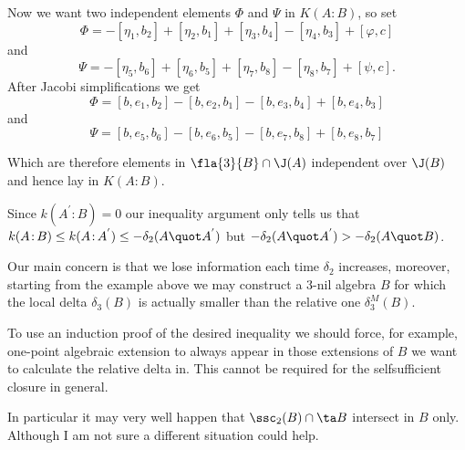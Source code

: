 \documentclass[a4paper,11pt,german,english]{article}
\begin{document}
\medskip
Now we want two independent elements $\Phi$ and $\Psi$ in $K(A\colon\!B)$, so set
$$\Phi=-[\eta_{1},b_{2}]+[\eta_{2},b_{1}]+[\eta_{3},b_{4}]-[\eta_{4},b_{3}]+[\varphi,c]$$
and
$$\Psi=-[\eta_{5},b_{6}]+[\eta_{6},b_{5}]+[\eta_{7},b_{8}]-[\eta_{8},b_{7}]+[\psi,c].$$
After Jacobi simplifications we get
$$\Phi=[b,e_{1},b_{2}]-[b,e_{2},b_{1}]-[b,e_{3},b_{4}]+[b,e_{4},b_{3}]$$
and
$$\Psi=[b,e_{5},b_{6}]-[b,e_{6},b_{5}]-[b,e_{7},b_{8}]+[b,e_{8},b_{7}]$$

Which are therefore elements in $\fla{3}{B}\cap\J(A)$ independent over $\J(B)$ and
hence lay in $K(A\colon\!B)$.

\medskip
Since $k(A^{'}\colon\!B)=0$ our inequality argument only tells us that 
$k(A\colon\!B)\leq k(A\colon\!A^{'})\leq -\delta_{2}(A\quot A^{'})$ but 
$-\delta_{2}(A\quot A^{'})>-\delta_{2}(A\quot B)$.

\medskip
Our main concern is that we lose information each time $\delta_{2}$ increases, moreover,
starting from the example above we may construct a $3$-nil algebra $B$ for which
the local delta $\delta_{3}(B)$ is actually smaller than the relative one $\delta_{3}^{M}(B)$.

\medskip
To use an induction proof of the desired inequality we should force, for example,
one-point algebraic extension to always appear in those extensions of $B$
we want to calculate the relative delta in.
This cannot be required for the selfsufficient closure in general.

In particular it may very well happen
that $\ssc_{2}(B)\cap\ta B$ intersect in $B$ only. Although I am not sure a different
situation could help.
\end{document}
